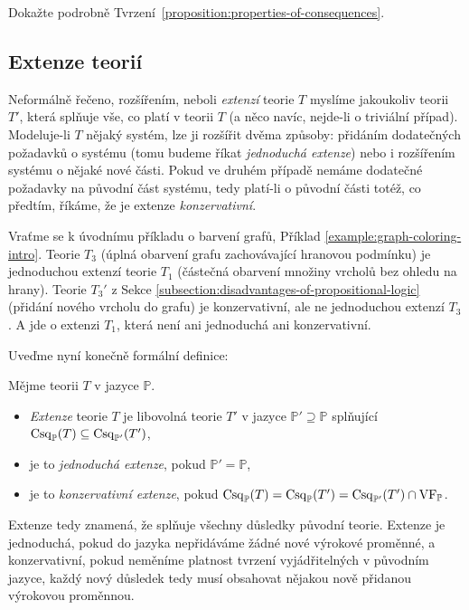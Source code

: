 \begin{exercise}
    Dokažte podrobně Tvrzení~\ref{proposition:properties-of-consequences}.
\end{exercise}

\subsection{Extenze teorií}

Neformálně řečeno, rozšířením, neboli \emph{extenzí} teorie $T$ myslíme jakoukoliv teorii $T'$, která splňuje vše, co platí v teorii $T$ (a něco navíc, nejde-li o triviální případ). Modeluje-li $T$ nějaký systém, lze ji rozšířit dvěma způsoby: přidáním dodatečných požadavků o systému (tomu budeme říkat \emph{jednoduchá extenze}) nebo i rozšířením systému o nějaké nové části. Pokud ve druhém případě nemáme dodatečné požadavky na původní část systému, tedy platí-li o původní části totéž, co předtím, říkáme, že je extenze \emph{konzervativní}.

\begin{example}
    Vraťme se k úvodnímu příkladu o barvení grafů, Příklad \ref{example:graph-coloring-intro}. Teorie $T_3$ (úplná obarvení grafu zachovávající hranovou podmínku) je jednoduchou extenzí teorie $T_1$ (částečná obarvení množiny vrcholů bez ohledu na hrany). Teorie $T_3'$ z Sekce \ref{subsection:disadvantages-of-propositional-logic} (přidání nového vrcholu do grafu) je konzervativní, ale ne jednoduchou extenzí $T_3$. A jde o extenzi $T_1$, která není ani jednoduchá ani konzervativní.
\end{example}

Uveďme nyní konečně formální definice:

\begin{definition}
    Mějme teorii $T$ v jazyce $\mathbb P$.
    \begin{itemize}
        \item \emph{Extenze} teorie $T$ je libovolná teorie $T'$ v jazyce $\mathbb P'\supseteq\mathbb P$ splňující $\operatorname{Csq}_\mathbb P(T)\subseteq\operatorname{Csq}_{\mathbb P'}(T')$,
        \item je to \emph{jednoduchá extenze}, pokud $\mathbb P'=\mathbb P$,
        \item je to \emph{konzervativní extenze}, pokud $\operatorname{Csq}_\mathbb P(T)=\operatorname{Csq}_\mathbb P(T')=\operatorname{Csq}_{\mathbb P'}(T')\cap \operatorname{VF}_\mathbb P$.
    \end{itemize}
\end{definition}
Extenze tedy znamená, že splňuje všechny důsledky původní teorie. Extenze je jednoduchá, pokud do jazyka nepřidáváme žádné nové výrokové proměnné, a konzervativní, pokud neměníme platnost tvrzení vyjádřitelných v původním jazyce, každý nový důsledek tedy musí obsahovat nějakou nově přidanou výrokovou proměnnou. 

